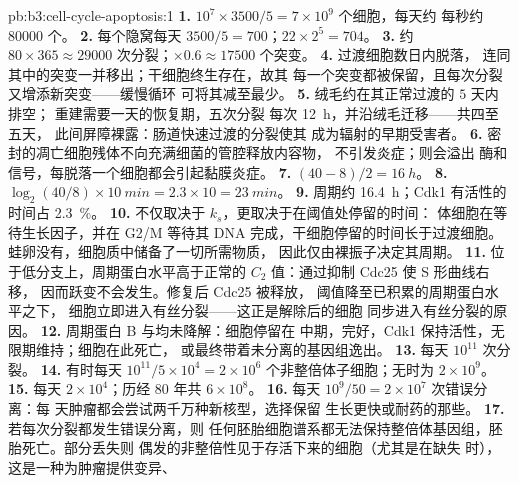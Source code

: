 \begin{solution}{pb:b3:cell-cycle-apoptosis:1}
\textbf{1.} $10^{7}\times 3500/5 = 7\times 10^{9}$ 个细胞，每天约
每秒约 \num{80000} 个。
\textbf{2.} 每个隐窝每天 $3500/5 = 700$；$22\times 2^{5} = 704$。
\textbf{3.} 约 $80\times 365 \approx \num{29000}$ 次分裂；$\times 0.6
\approx \num{17500}$ 个突变。
\textbf{4.} 过渡细胞数日内脱落，
连同其中的突变一并移出；干细胞终生存在，故其
每一个突变都被保留，且每次分裂又增添新突变——缓慢循环
可将其减至最少。
\textbf{5.} 绒毛约在其正常过渡的 $5$ 天内排空；
重建需要一天的恢复期，五次分裂
每次 \qty{12}{h}，并沿绒毛迁移——共四至五天，
此间屏障裸露：肠道快速过渡的分裂使其
成为辐射的早期受害者。
\textbf{6.} 密封的凋亡细胞残体不向充满细菌的管腔释放内容物，
不引发炎症；则会溢出
酶和信号，每脱落一个细胞都会引起黏膜炎症。
\textbf{7.} $(40 - 8)/2 = \qty{16}{h}$。
\textbf{8.} $\log_{2}(40/8)\times \qty{10}{min} = 2.3\times 10 =
\qty{23}{min}$。
\textbf{9.} 周期约 \qty{16.4}{h}；Cdk1 有活性的
时间占 \qty{2.3}{\%}。
\textbf{10.} 不仅取决于 $k_{s}$，更取决于在阈值处停留的时间：
体细胞在等待生长因子，并在
G2/M 等待其 DNA 完成，干细胞停留的时间长于过渡细胞。
蛙卵没有，细胞质中储备了一切所需物质，
因此仅由裸振子决定其周期。
\textbf{11.} 位于低分支上，周期蛋白水平高于正常的
$C_{2}$ 值：通过抑制 Cdc25 使 S 形曲线右移，
因而跃变不会发生。修复后 Cdc25 被释放，
阈值降至已积累的周期蛋白水平之下，
细胞立即进入有丝分裂——这正是解除后的细胞
同步进入有丝分裂的原因。
\textbf{12.} 周期蛋白 B 与均未降解：细胞停留在
中期，完好，Cdk1 保持活性，无限期维持；细胞在此死亡，
或最终带着未分离的基因组逸出。
\textbf{13.} 每天 $10^{11}$ 次分裂。
\textbf{14.} 有时每天 $10^{11}/5\times 10^{4} = 2\times 10^{6}$
个非整倍体子细胞；无时为 $2\times 10^{9}$。
\textbf{15.} 每天 $2\times 10^{4}$；历经 $80$ 年共 $6\times 10^{8}$。
\textbf{16.} 每天 $10^{9}/50 = 2\times 10^{7}$ 次错误分离：每
天肿瘤都会尝试两千万种新核型，选择保留
生长更快或耐药的那些。
\textbf{17.} 若每次分裂都发生错误分离，则
任何胚胎细胞谱系都无法保持整倍体基因组，胚胎死亡。部分丢失则
偶发的非整倍性见于存活下来的细胞（尤其是在缺失
 时），这是一种为肿瘤提供变异、

\end{solution}
